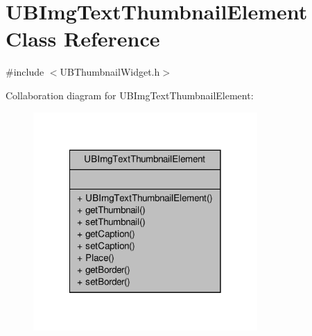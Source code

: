 \hypertarget{class_u_b_img_text_thumbnail_element}{\section{U\-B\-Img\-Text\-Thumbnail\-Element Class Reference}
\label{d3/d5d/class_u_b_img_text_thumbnail_element}
}


{\ttfamily \#include $<$U\-B\-Thumbnail\-Widget.\-h$>$}



Collaboration diagram for U\-B\-Img\-Text\-Thumbnail\-Element\-:
\nopagebreak
\begin{figure}[H]
\begin{center}
\leavevmode
\includegraphics[width=242pt]{d7/da9/class_u_b_img_text_thumbnail_element__coll__graph}
\end{center}
\end{figure}

